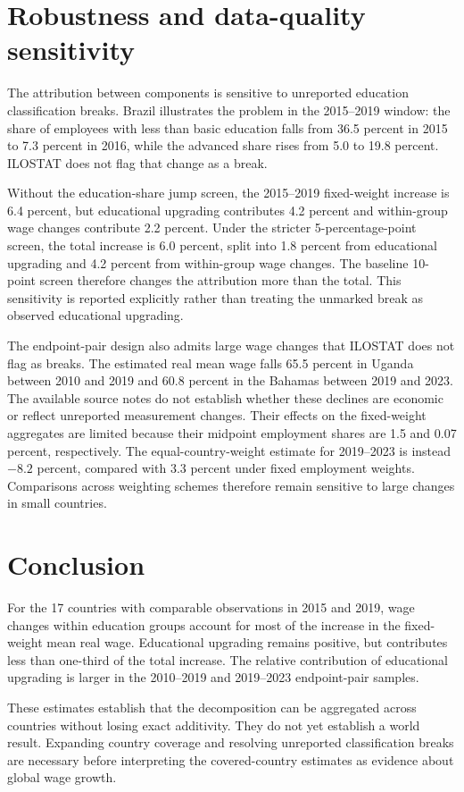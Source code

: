 \documentclass[11pt]{article}
\begin{document}
\section{Robustness and data-quality sensitivity}

The attribution between components is sensitive to unreported education
classification breaks. Brazil illustrates the problem in the 2015--2019
window: the share of employees with less than basic education falls from 36.5
percent in 2015 to 7.3 percent in 2016, while the advanced share rises from
5.0 to 19.8 percent. ILOSTAT does not flag that change as a break.

Without the education-share jump screen, the 2015--2019 fixed-weight increase
is 6.4 percent, but educational upgrading contributes 4.2 percent and
within-group wage changes contribute 2.2 percent. Under the stricter
5-percentage-point screen, the total increase is 6.0 percent, split into 1.8
percent from educational upgrading and 4.2 percent from within-group wage
changes. The baseline 10-point screen therefore changes the attribution more
than the total. This sensitivity is reported explicitly rather than treating
the unmarked break as observed educational upgrading.

The endpoint-pair design also admits large wage changes that ILOSTAT does not
flag as breaks. The estimated real mean wage falls 65.5 percent in Uganda
between 2010 and 2019 and 60.8 percent in the Bahamas between 2019 and 2023.
The available source notes do not establish whether these declines are
economic or reflect unreported measurement changes. Their effects on the
fixed-weight aggregates are limited because their midpoint employment shares
are 1.5 and 0.07 percent, respectively. The equal-country-weight estimate for
2019--2023 is instead \(-8.2\) percent, compared with 3.3 percent under fixed
employment weights. Comparisons across weighting schemes therefore remain
sensitive to large changes in small countries.

\section{Conclusion}

For the 17 countries with comparable observations in 2015 and 2019, wage
changes within education groups account for most of the increase in the
fixed-weight mean real wage. Educational upgrading remains positive, but
contributes less than one-third of the total increase. The relative
contribution of educational upgrading is larger in the 2010--2019 and
2019--2023 endpoint-pair samples.

These estimates establish that the decomposition can be aggregated across
countries without losing exact additivity. They do not yet establish a world
result. Expanding country coverage and resolving unreported classification
breaks are necessary before interpreting the covered-country estimates as
evidence about global wage growth.



\end{document}
